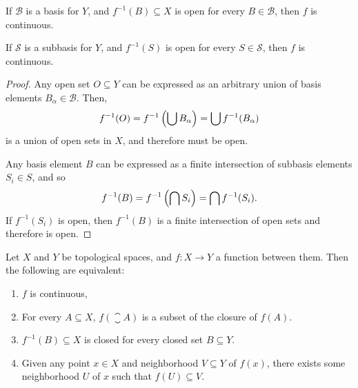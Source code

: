 \begin{lemma}
    If $\mathcal{B}$ is a basis for $Y$, and $f^{-1}(B) \subseteq X$ is open for every $B \in \mathcal{B}$, then $f$ is continuous.

    If $\mathcal{S}$ is a subbasis for $Y$, and $f^{-1}(S)$ is open for every $S \in \mathcal{S}$, then $f$ is continuous.
\end{lemma}

\begin{proof}
    Any open set $O \subseteq Y$ can be expressed as an arbitrary union of basis elements $B_{\alpha} \in \mathcal{B}$. Then,
    \begin{align*}
        f^{-1}(O) = f^{-1}\left(\bigcup B_{\alpha}\right) = \bigcup f^{-1}(B_{\alpha})
    \end{align*}
    is a union of open sets in $X$, and therefore must be open.

    Any basis element $B$ can be expressed as a finite intersection of subbasis elements $S_{i} \in S$, and so
    \begin{align*}
        f^{-1}(B) = f^{-1}\left(\bigcap S_{i}\right) = \bigcap f^{-1}(S_i).
    \end{align*}
    If $f^{-1}(S_i)$ is open, then $f^{-1}(B)$ is a finite intersection of open sets and therefore is open.
\end{proof}

\begin{thm}\label{thm:continuity-characterizations} Let $X$ and $Y$ be topological spaces, and $f: X \to Y$ a function between them. Then the following are equivalent:
    \begin{enumerate}[label=(\arabic*)]
        \item $f$ is continuous,
        \item For every $A \subseteq X$, $f(\closure{A})$ is a subset of the closure of $f(A)$.
        \item $f^{-1}(B) \subseteq X$ is closed for every closed set $B \subseteq Y$.
        \item Given any point $x \in X$ and neighborhood $V \subseteq Y$ of $f(x)$, there exists some neighborhood $U$ of $x$ such that $f(U) \subseteq V$.
    \end{enumerate}
\end{thm}

